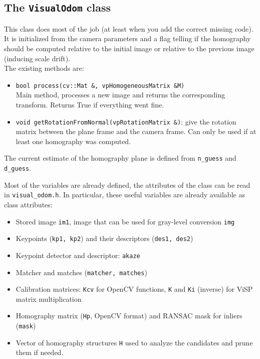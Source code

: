 \documentclass{ecnreport}
\begin{document}
\subsection{The \texttt{VisualOdom} class}

This class does most of the job (at least when you add the correct missing code). It is initialized from the camera parameters and a flag telling if the homography
should be computed relative to the initial image or relative to the previous image (inducing scale drift).\\
The existing methods are:
\begin{itemize}
 \item \texttt{bool process(cv::Mat \&, vpHomogeneousMatrix \&M)} \\ 
 Main method, processes a new image and returns the corresponding transform. Returns True if everything went fine. 
 \item \texttt{void getRotationFromNormal(vpRotationMatrix \&)}: give the rotation matrix between the plane frame and the camera frame. Can only be used
 if at least one homography was computed.
\end{itemize}
The current estimate of the homography plane is defined from \texttt{n\_guess} and \texttt{d\_guess}.

Most of the variables are already defined, the attributes of the class can be read in \texttt{visual\_odom.h}. In particular, 
these useful variables are already available as class attributes:
\begin{itemize}
\item Stored image \texttt{im1}, image that can be used for gray-level conversion \texttt{img}
 \item Keypoints (\texttt{kp1, kp2}) and their descriptors (\texttt{des1, des2})
 \item Keypoint detector and descriptor: \texttt{akaze}
 \item Matcher and matches (\texttt{matcher, matches})
 \item Calibration matrices: \texttt{Kcv} for OpenCV functions, \texttt{K} and \texttt{Ki} (inverse) for ViSP matrix multiplication
 \item Homography matrix (\texttt{Hp}, OpenCV format) and RANSAC mask for inliers (\texttt{mask})
 \item Vector of homography structures \texttt{H} used to analyze the candidates and prune them if needed.
\end{itemize}
\end{document}
